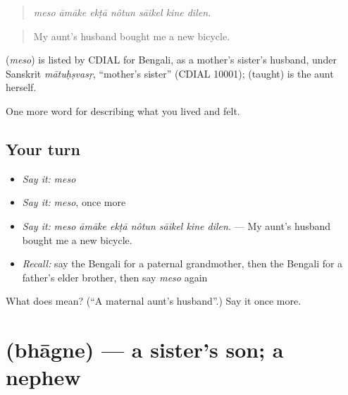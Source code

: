 \begin{quote}
      
\end{quote}

\begin{quote}
\emph{meso āmāke ekṭā nôtun sāikel kine dilen.}
\end{quote}

\begin{quote}
My aunt's husband bought me a new bicycle.
\end{quote}

\begin{cousinweb}
\textbf{} (\emph{meso}) is listed by CDIAL for Bengali, as a mother's sister's husband, under Sanskrit \emph{mātuḥṣvasṛ}, \textquotedblleft{}mother's sister\textquotedblright{} (CDIAL 10001);  (taught) is the aunt herself.
\end{cousinweb}

\begin{grammarlens}[title={What you've built}]
One more word for describing what you lived and felt.
\end{grammarlens}

\subsection*{Your turn}
\begin{itemize}
\raggedright
  \item \emph{Say it:} \emph{meso}
  \item \emph{Say it:} \emph{meso}, once more
  \item \emph{Say it:} \emph{meso āmāke ekṭā nôtun sāikel kine dilen.} — My aunt's husband bought me a new bicycle.
  \item \emph{Recall:} say the Bengali for a paternal grandmother, then the Bengali for a father's elder brother, then say \emph{meso} again
\end{itemize}

\begin{tcolorbox}[breakable,colback=teal!4,colframe=teal!35!black,title={Before you move on}]
What does  mean? (\textquotedblleft{}A maternal aunt's husband\textquotedblright{}.) Say it once more.
\end{tcolorbox}
\section[\texorpdfstring{\bn{ভাগ্নে} (bhāgne)}{ভাগ্নে (bhāgne)}]{ (bhāgne) — a sister's son; a nephew}

